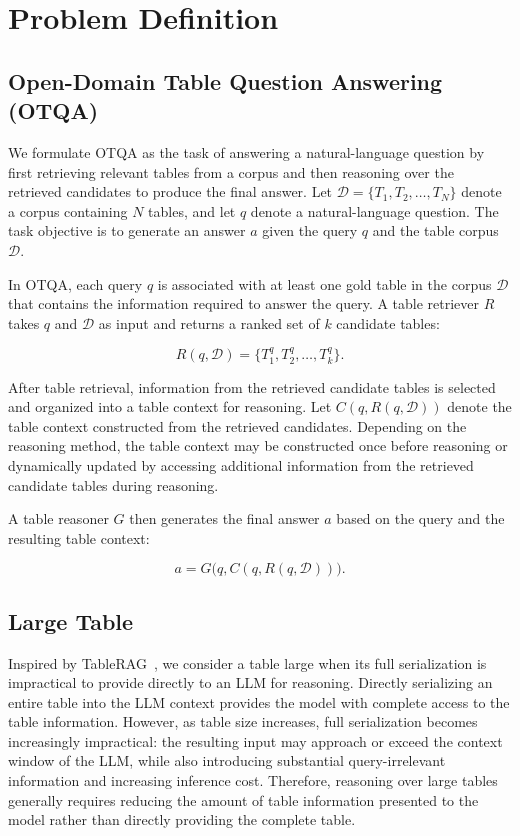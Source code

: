 
\chapter{Problem Definition}

\section{Open-Domain Table Question Answering (OTQA)}
We formulate OTQA as the task of answering a natural-language question by first retrieving relevant tables from a corpus and then reasoning over the retrieved candidates to produce the final answer.
Let $\mathcal{D}=\{T_1,T_2,\ldots,T_N\}$ denote a corpus containing $N$ tables, and let $q$ denote a natural-language question.
The task objective is to generate an answer $a$ given the query $q$ and the table corpus $\mathcal{D}$.

In OTQA, each query $q$ is associated with at least one gold table in the corpus $\mathcal{D}$ that contains the information required to answer the query.
A table retriever $R$ takes $q$ and $\mathcal{D}$ as input and returns a ranked set of $k$ candidate tables:

\[
R(q,\mathcal{D})
= \{T_1^q,T_2^q,\ldots,T_k^q\}.
\]

After table retrieval, information from the retrieved candidate tables is selected and organized into a table context for reasoning.
Let $C(q,R(q,\mathcal{D}))$ denote the table context constructed from the retrieved candidates.
Depending on the reasoning method, the table context may be constructed once before reasoning or dynamically updated by accessing additional information from the retrieved candidate tables during reasoning.

A table reasoner $G$ then generates the final answer $a$ based on the query and the resulting table context:

\[
a = G\bigl(q, C(q,R(q,\mathcal{D}))\bigr).
\]

\section{Large Table}
\label{sec:large_table}
Inspired by TableRAG~\cite{tablerag}, we consider a table large when its full serialization is impractical to provide directly to an LLM for reasoning.
Directly serializing an entire table into the LLM context provides the model with complete access to the table information.
However, as table size increases, full serialization becomes increasingly impractical: the resulting input may approach or exceed the context window of the LLM, while also introducing substantial query-irrelevant information and increasing inference cost.
Therefore, reasoning over large tables generally requires reducing the amount of table information presented to the model rather than directly providing the complete table.

